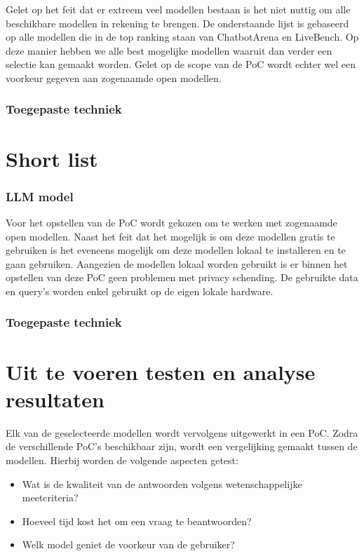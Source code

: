 Gelet op het feit dat er extreem veel modellen bestaan is het niet nuttig om alle beschikbare modellen in rekening te brengen. 
De onderstaande lijst is gebaseerd op alle modellen die in de top ranking staan van ChatbotArena en LiveBench. 
Op deze manier hebben we alle best mogelijke modellen waaruit dan verder een selectie kan gemaakt worden. 
Gelet op de scope van de PoC wordt echter wel een voorkeur gegeven aan zogenaamde open modellen.

\subsubsection{Toegepaste techniek}

\section{Short list}

\subsubsection{LLM model}

Voor het opstellen van de PoC wordt gekozen om te werken met zogenaamde open modellen. Naast het feit dat het mogelijk is om deze modellen gratis te gebruiken is het eveneens mogelijk om deze modellen lokaal te installeren en te gaan gebruiken. Aangezien de modellen lokaal worden gebruikt is er binnen het opstellen van deze PoC geen problemen met privacy schending. De gebruikte data en query's worden enkel gebruikt op de eigen lokale hardware.

\subsubsection{Toegepaste techniek}


\section{Uit te voeren testen en analyse resultaten}

Elk van de geselecteerde modellen wordt vervolgens uitgewerkt in een PoC. Zodra de verschillende PoC’s beschikbaar zijn, wordt een vergelijking gemaakt tussen de modellen. Hierbij worden de volgende aspecten getest:

\begin{itemize}
    \item Wat is de kwaliteit van de antwoorden volgens wetenschappelijke meetcriteria?
    \item Hoeveel tijd kost het om een vraag te beantwoorden?
    \item Welk model geniet de voorkeur van de gebruiker?
\end{itemize}


